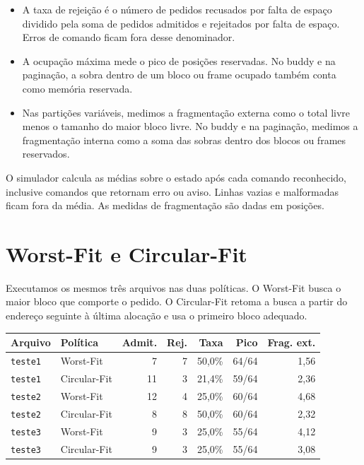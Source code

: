 \documentclass[11pt,a4paper]{article}
\newcommand{\arquivo}[1]{\texttt{#1}}
\begin{document}
\begin{itemize}
    \item A taxa de rejeição é o número de pedidos recusados por falta de
    espaço dividido pela soma de pedidos admitidos e rejeitados por falta
    de espaço. Erros de comando ficam fora desse denominador.
    \item A ocupação máxima mede o pico de posições reservadas. No buddy
    e na paginação, a sobra dentro de um bloco ou frame ocupado também
    conta como memória reservada.
    \item Nas partições variáveis, medimos a fragmentação externa como o
    total livre menos o tamanho do maior bloco livre. No buddy e na
    paginação, medimos a fragmentação interna como a soma das sobras
    dentro dos blocos ou frames reservados.
\end{itemize}

O simulador calcula as médias sobre o estado após cada comando reconhecido,
inclusive comandos que retornam erro ou aviso. Linhas vazias e malformadas
ficam fora da média. As medidas de fragmentação são dadas em posições.

\clearpage

\section{Worst-Fit e Circular-Fit}

Executamos os mesmos três arquivos nas duas políticas. O Worst-Fit busca
o maior bloco que comporte o pedido. O Circular-Fit retoma a busca a partir
do endereço seguinte à última alocação e usa o primeiro bloco adequado.

\begin{center}
\label{tab:politicas}
\small
\begin{tabular}{@{}llrrrrr@{}}
\toprule
Arquivo & Política & Admit. & Rej. & Taxa & Pico & Frag. ext. \\
\midrule
\arquivo{teste1} & Worst-Fit    &  7 & 7 & 50,0\% & 64/64 & 1,56 \\
\arquivo{teste1} & Circular-Fit & 11 & 3 & 21,4\% & 59/64 & 2,36 \\
\arquivo{teste2} & Worst-Fit    & 12 & 4 & 25,0\% & 60/64 & 4,68 \\
\arquivo{teste2} & Circular-Fit &  8 & 8 & 50,0\% & 60/64 & 2,32 \\
\arquivo{teste3} & Worst-Fit    &  9 & 3 & 25,0\% & 55/64 & 4,12 \\
\arquivo{teste3} & Circular-Fit &  9 & 3 & 25,0\% & 55/64 & 3,08 \\
\bottomrule
\end{tabular}
\end{center}
\end{document}
